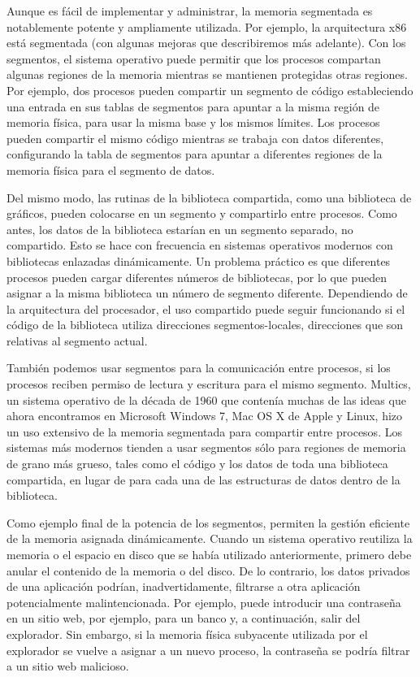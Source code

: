 \documentclass[10pt]{book}
\begin{document}
Aunque es fácil de implementar y administrar, la memoria segmentada es notablemente potente y ampliamente utilizada. Por ejemplo, la arquitectura x86 está segmentada (con algunas mejoras que describiremos más adelante). Con los segmentos, el sistema operativo puede permitir que los procesos compartan algunas regiones de la memoria mientras se mantienen protegidas otras regiones. Por ejemplo, dos procesos pueden compartir un segmento de código estableciendo una entrada en sus tablas de segmentos para apuntar a la misma región de memoria física, para usar la misma base y los mismos límites. Los procesos pueden compartir el mismo código mientras se trabaja con datos diferentes, configurando la tabla de segmentos para apuntar a diferentes regiones de la memoria física para el segmento de datos.

Del mismo modo, las rutinas de la biblioteca compartida, como una biblioteca de gráficos, pueden colocarse en un segmento y compartirlo entre procesos. Como antes, los datos de la biblioteca estarían en un segmento separado, no compartido. Esto se hace con frecuencia en sistemas operativos modernos con bibliotecas enlazadas dinámicamente. Un problema práctico es que diferentes procesos pueden cargar diferentes números de bibliotecas, por lo que pueden asignar a la misma biblioteca un número de segmento diferente. Dependiendo de la arquitectura del procesador, el uso compartido puede seguir funcionando si el código de la biblioteca utiliza direcciones segmentos-locales, direcciones que son relativas al segmento actual.

También podemos usar segmentos para la comunicación entre procesos, si los procesos reciben permiso de lectura y escritura para el mismo segmento. Multics, un sistema operativo de la década de 1960 que contenía muchas de las ideas que ahora encontramos en Microsoft Windows 7, Mac OS X de Apple y Linux, hizo un uso extensivo de la memoria segmentada para compartir entre procesos. Los sistemas más modernos tienden a usar segmentos sólo para regiones de memoria de grano más grueso, tales como el código y los datos de toda una biblioteca compartida, en lugar de para cada una de las estructuras de datos dentro de la biblioteca.

Como ejemplo final de la potencia de los segmentos, permiten la gestión eficiente de la memoria asignada dinámicamente. Cuando un sistema operativo reutiliza la memoria o el espacio en disco que se había utilizado anteriormente, primero debe anular el contenido de la memoria o del disco. De lo contrario, los datos privados de una aplicación podrían, inadvertidamente, filtrarse a otra aplicación potencialmente malintencionada. Por ejemplo, puede introducir una contraseña en un sitio web, por ejemplo, para un banco y, a continuación, salir del explorador. Sin embargo, si la memoria física subyacente utilizada por el explorador se vuelve a asignar a un nuevo proceso, la contraseña se podría filtrar a un sitio web malicioso.
\end{document}
